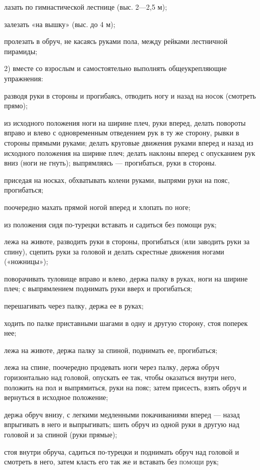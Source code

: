 \documentclass[a5paper]{book}
\begin{document}
лазать по гимнастической лестнице (выс. 2---2,5 м);

залезать «на вышку» (выс. до 4 м);

пролезать в обруч, не касаясь руками пола, между рейками лестничной
пирамиды;

2) вместе со взрослым и самостоятельно выполнять общеукрепляющие
упражнения:

разводя руки в стороны и прогибаясь, отводить ногу и назад на носок
(смотреть прямо);

из исходного положения ноги на ширине плеч, руки вперед, делать повороты
вправо и влево с одновременным отведением рук в ту же сторону, рывки в
стороны прямыми руками; делать круговые движения руками вперед и назад
из исходного положения на ширине плеч; делать наклоны вперед с
опусканием рук вниз (ноги не гнуть); выпрямляясь --- прогибаться, руки в
стороны.

приседая на носках, обхватывать колени руками, выпрями руки на пояс,
прогибаться;

поочередно махать прямой ногой вперед и хлопать по ноге;

из положения сидя по-турецки вставать и садиться без помощи рук;

лежа на животе, разводить руки в стороны, прогибаться (или заводить руки
за спину), сцепить руки за головой и делать скрестные движения ногами
(«ножницы»);

поворачивать туловище вправо и влево, держа палку в руках, ноги на
ширине плеч; с выпрямлением поднимать руки вверх и прогибаться;

перешагивать через палку, держа ее в руках;

ходить по палке приставными шагами в одну и другую сторону, стоя поперек
нее;

лежа на животе, держа палку за спиной, поднимать ее, прогибаться;

лежа на спине, поочередно продевать ноги через палку, держа обруч
горизонтально над головой, опускать ее так, чтобы оказаться внутри него,
положить на пол и выпрямиться, руки на пояс; затем присесть, взять обруч
и вернуться в исходное положение;

держа обруч внизу, с легкими медленными покачиваниями вперед --- назад
впрыгивать в него и выпрыгивать; шить обруч из одной руки в другую над
головой и за спиной (руки прямые);

стоя внутри обруча, садиться по-турецки и поднимать обруч над головой и
смотреть в него, затем класть его так же и вставать без \textsc{помощи}
рук;
\end{document}
